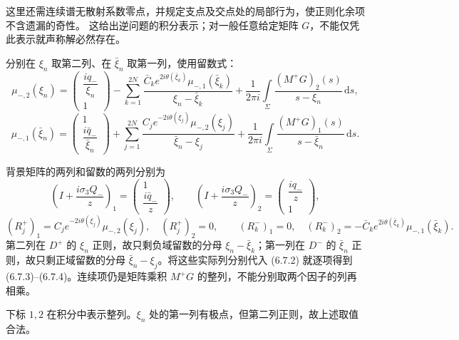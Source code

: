 \documentclass[lang=cn,scheme=chinese,mode=simple,device=normal,color=blue,
math=cm,thmcnt=section,12pt]{elegantbook}
\newcommand{\dd}{\,\mathrm{d}}
\newcommand{\eqq}[2]{\tag{#1}\label{eq:#1}#2}
\begin{document}
这里还需连续谱无散射系数零点，并规定支点及交点处的局部行为，使正则化余项不含遗漏的奇性。
这给出逆问题的积分表示；对一般任意给定矩阵 $G$，不能仅凭此表示就声称解必然存在。

分别在 $\xi_n$ 取第二列、在 $\bar\xi_n$ 取第一列，使用留数式：
\begin{equation}
    \eqq{6.7.3}{\mu_{-,2}(\xi_n)=
        \begin{pmatrix}\dfrac{iq_-}{\xi_n}\\1\end{pmatrix}
        -\sum\limits_{k=1}^{2N}\dfrac{\bar C_ke^{2i\theta(\bar\xi_k)}\mu_{-,1}(\bar\xi_k)}{\xi_n-\bar\xi_k}
        +\dfrac{1}{2\pi i}\int\limits_\Sigma\dfrac{(M^+G)_2(s)}{s-\xi_n}\dd s,}
\end{equation}
\begin{equation}
    \eqq{6.7.4}{\mu_{-,1}(\bar\xi_n)=
        \begin{pmatrix}1\\\dfrac{i\bar q_-}{\bar\xi_n}\end{pmatrix}
        +\sum\limits_{j=1}^{2N}\dfrac{C_je^{-2i\theta(\xi_j)}\mu_{-,2}(\xi_j)}{\bar\xi_n-\xi_j}
        +\dfrac{1}{2\pi i}\int\limits_\Sigma\dfrac{(M^+G)_1(s)}{s-\bar\xi_n}\dd s.}
\end{equation}

\begin{callout}[计算：从整矩阵积分表示逐列提取取值方程]
    背景矩阵的两列和留数的两列分别为
    \[
        \left(I+\dfrac{i\sigma_3Q_-}{z}\right)_1=\begin{pmatrix}1\\\dfrac{i\bar q_-}{z}\end{pmatrix},\qquad
        \left(I+\dfrac{i\sigma_3Q_-}{z}\right)_2=\begin{pmatrix}\dfrac{iq_-}{z}\\1\end{pmatrix},
    \]
    \[
        (R_j^+)_1=C_je^{-2i\theta(\xi_j)}\mu_{-,2}(\xi_j),\quad (R_j^+)_2=0,\qquad
        (R_k^-)_1=0,\quad (R_k^-)_2=-\bar C_ke^{2i\theta(\bar\xi_k)}\mu_{-,1}(\bar\xi_k).
    \]
    第二列在 $D^+$ 的 $\xi_n$ 正则，故只剩负域留数的分母 $\xi_n-\bar\xi_k$；第一列在 $D^-$ 的 $\bar\xi_n$ 正则，故只剩正域留数的分母 $\bar\xi_n-\xi_j$。将这些实际列分别代入 (6.7.2) 就逐项得到 (6.7.3)–(6.7.4)。连续项仍是矩阵乘积 $M^+G$ 的整列，不能分别取两个因子的列再相乘。
\end{callout}

下标 $1,2$ 在积分中表示整列。$\xi_n$ 处的第一列有极点，但第二列正则，故上述取值合法。
\end{document}

